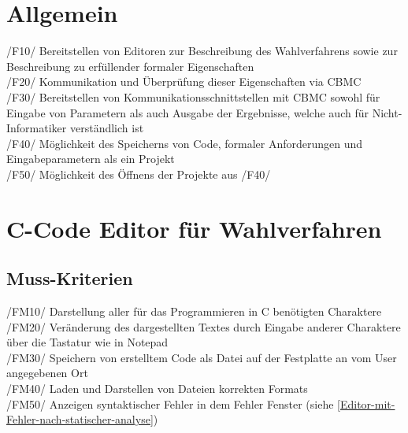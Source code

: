 \documentclass[a4paper]{scrreprt}
\begin{document}
\section{Allgemein}
/F10/ Bereitstellen von Editoren zur Beschreibung des Wahlverfahrens sowie zur Beschreibung zu erfüllender formaler Eigenschaften \\
/F20/ Kommunikation und Überprüfung dieser Eigenschaften via \ac{CBMC} \\
/F30/ Bereitstellen von Kommunikationsschnittstellen mit \ac{CBMC} sowohl für Eingabe von Parametern als auch Ausgabe der Ergebnisse, welche auch für Nicht-Informatiker verständlich ist \\
/F40/ Möglichkeit des Speicherns von Code, formaler Anforderungen und Eingabeparametern als ein Projekt \\
/F50/ Möglichkeit des Öffnens der Projekte aus /F40/

\section{C-Code Editor für Wahlverfahren}
\subsection{Muss-Kriterien}
/FM10/ Darstellung aller für das Programmieren in C benötigten Charaktere \\
/FM20/ Veränderung des dargestellten Textes durch Eingabe anderer Charaktere über die Tastatur wie in Notepad \\
/FM30/ Speichern von erstelltem Code als Datei auf der Festplatte an vom User angegebenen Ort \\
/FM40/ Laden und Darstellen von Dateien korrekten Formats \\
/FM50/ Anzeigen syntaktischer Fehler in dem Fehler Fenster (siehe \ref{Editor-mit-Fehler-nach-statischer-analyse})
\end{document}
